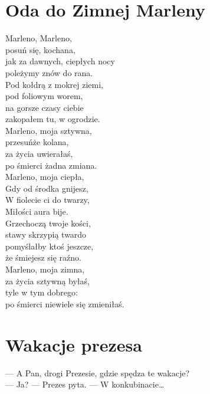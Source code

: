 \documentclass[12pt, a4paper]{memoir}
\renewenvironment{verse}{%
  \par\vspace{\baselineskip}\raggedright
}{
  \par\vspace{\baselineskip}
}
\begin{document}
\clearpage

\section{Oda do Zimnej Marleny}
\begin{verse}
Marleno, Marleno,\\
posuń się, kochana,\\
jak za dawnych, ciepłych nocy\\
poleżymy znów do rana.\\[\baselineskip]

Pod kołdrą z mokrej ziemi,\\
pod foliowym worem,\\
na gorsze czasy ciebie\\
zakopałem tu, w ogrodzie.\\[\baselineskip]

Marleno, moja sztywna,\\
przesuńże kolana,\\
za życia uwierałaś,\\
po śmierci żadna zmiana.\\[\baselineskip]

Marleno, moja ciepła,\\
Gdy od środka gnijesz,\\
W fiolecie ci do twarzy,\\
Miłości aura bije.\\[\baselineskip]

Grzechoczą twoje kości,\\
stawy skrzypią twardo\\
pomyślałby ktoś jeszcze,\\
że śmiejesz się raźno.\\[\baselineskip]

Marleno, moja zimna,\\
za życia sztywną byłaś,\\
tyle w tym dobrego:\\
po śmierci niewiele się zmieniłaś.
\end{verse}

\clearpage

\section{Wakacje prezesa}
\begin{verse}
--- A Pan, drogi Prezesie, gdzie spędza te wakacje?\\[\baselineskip]
--- Ja? --- Prezes pyta. --- W konkubinacie\dots
\end{verse}
\end{document}
